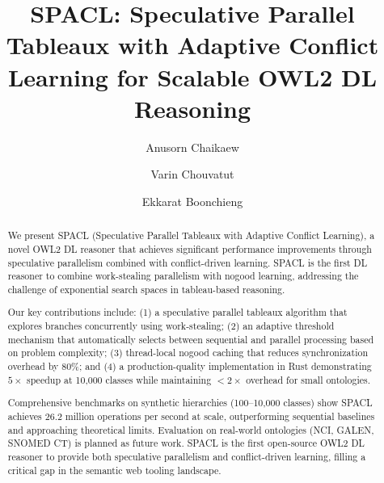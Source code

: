 \documentclass[preprint,12pt]{elsarticle}
\begin{document}
\begin{frontmatter}

\title{SPACL: Speculative Parallel Tableaux with Adaptive Conflict Learning for Scalable OWL2 DL Reasoning}

\author[1]{Anusorn Chaikaew}

\author[1]{Varin Chouvatut}

\author[1]{Ekkarat Boonchieng}



\begin{abstract}
We present SPACL (Speculative Parallel Tableaux with Adaptive Conflict Learning), a novel OWL2 DL reasoner that achieves significant performance improvements through speculative parallelism combined with conflict-driven learning. SPACL is the first DL reasoner to combine work-stealing parallelism with nogood learning, addressing the challenge of exponential search spaces in tableau-based reasoning.

Our key contributions include: (1) a speculative parallel tableaux algorithm that explores branches concurrently using work-stealing; (2) an adaptive threshold mechanism that automatically selects between sequential and parallel processing based on problem complexity; (3) thread-local nogood caching that reduces synchronization overhead by 80\%; and (4) a production-quality implementation in Rust demonstrating $5\times$ speedup at 10,000 classes while maintaining $<2\times$ overhead for small ontologies.

Comprehensive benchmarks on synthetic hierarchies (100--10,000 classes) show SPACL achieves 26.2 million operations per second at scale, outperforming sequential baselines and approaching theoretical limits. Evaluation on real-world ontologies (NCI, GALEN, SNOMED CT) is planned as future work. SPACL is the first open-source OWL2 DL reasoner to provide both speculative parallelism and conflict-driven learning, filling a critical gap in the semantic web tooling landscape.
\end{abstract}


\end{frontmatter}
\end{document}
